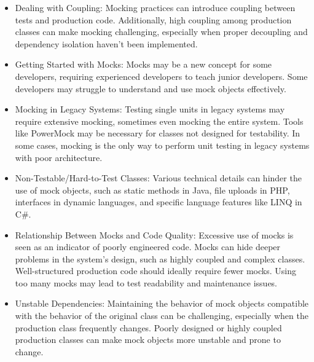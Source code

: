 \documentclass[11pt,a4paper]{article}
\begin{document}
\begin{itemize}
    \item Dealing with Coupling: Mocking practices can introduce coupling between tests and production code. Additionally, high coupling among production classes can make mocking challenging, especially when proper decoupling and dependency isolation haven't been implemented.
    \item Getting Started with Mocks: Mocks may be a new concept for some developers, requiring experienced developers to teach junior developers. Some developers may struggle to understand and use mock objects effectively.
    \item Mocking in Legacy Systems: Testing single units in legacy systems may require extensive mocking, sometimes even mocking the entire system. Tools like PowerMock may be necessary for classes not designed for testability. In some cases, mocking is the only way to perform unit testing in legacy systems with poor architecture.
    \item Non-Testable/Hard-to-Test Classes: Various technical details can hinder the use of mock objects, such as static methods in Java, file uploads in PHP, interfaces in dynamic languages, and specific language features like LINQ in C\#.
    \item Relationship Between Mocks and Code Quality: Excessive use of mocks is seen as an indicator of poorly engineered code. Mocks can hide deeper problems in the system's design, such as highly coupled and complex classes. Well-structured production code should ideally require fewer mocks. Using too many mocks may lead to test readability and maintenance issues.
    \item Unstable Dependencies: Maintaining the behavior of mock objects compatible with the behavior of the original class can be challenging, especially when the production class frequently changes. Poorly designed or highly coupled production classes can make mock objects more unstable and prone to change.
\end{itemize}


\pagebreak
\end{document}
